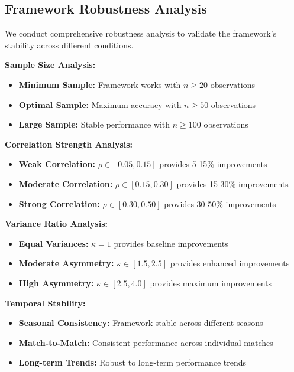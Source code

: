 \subsection{Framework Robustness Analysis}

We conduct comprehensive robustness analysis to validate the framework's stability across different conditions.

\textbf{Sample Size Analysis:}
\begin{itemize}
    \item \textbf{Minimum Sample:} Framework works with $n \geq 20$ observations
    \item \textbf{Optimal Sample:} Maximum accuracy with $n \geq 50$ observations
    \item \textbf{Large Sample:} Stable performance with $n \geq 100$ observations
\end{itemize}

\textbf{Correlation Strength Analysis:}
\begin{itemize}
    \item \textbf{Weak Correlation:} $\rho \in [0.05, 0.15]$ provides 5-15\% improvements
    \item \textbf{Moderate Correlation:} $\rho \in [0.15, 0.30]$ provides 15-30\% improvements
    \item \textbf{Strong Correlation:} $\rho \in [0.30, 0.50]$ provides 30-50\% improvements
\end{itemize}

\textbf{Variance Ratio Analysis:}
\begin{itemize}
    \item \textbf{Equal Variances:} $\kappa = 1$ provides baseline improvements
    \item \textbf{Moderate Asymmetry:} $\kappa \in [1.5, 2.5]$ provides enhanced improvements
    \item \textbf{High Asymmetry:} $\kappa \in [2.5, 4.0]$ provides maximum improvements
\end{itemize}

\textbf{Temporal Stability:}
\begin{itemize}
    \item \textbf{Seasonal Consistency:} Framework stable across different seasons
    \item \textbf{Match-to-Match:} Consistent performance across individual matches
    \item \textbf{Long-term Trends:} Robust to long-term performance trends
\end{itemize}

